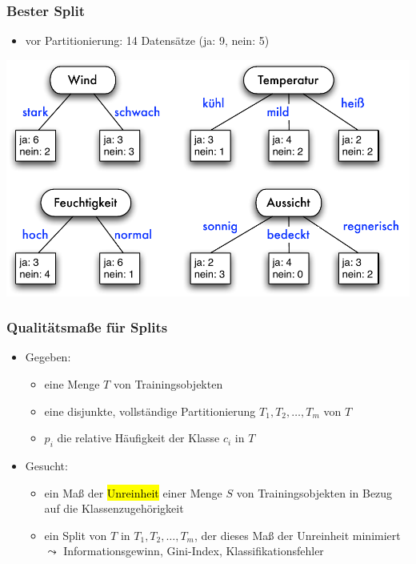 \begin{frame}
\frametitle{Bester Split}

\begin{itemize}
\item vor Partitionierung: 14 Datensätze (ja: 9, nein: 5)
\end{itemize}

\begin{center}
\includegraphics[scale=.5]{fig7/split-bewertung.pdf}
\end{center}

\begin{center}
\end{center}
\end{frame}

\begin{frame}
\frametitle{Qualitätsmaße für Splits}

\begin{itemize}
\item Gegeben:
\begin{itemize}
\item eine Menge $T$ von Trainingsobjekten
\item eine disjunkte, vollständige Partitionierung $T_1, T_2, \dots,
  T_m$  von $T$ 
\item $p_i$ die relative Häufigkeit der Klasse $c_i$ in $T$
\end{itemize}
\item Gesucht:
\begin{itemize}
\item ein Maß der \hl{Unreinheit} einer Menge $S$ von
  Trainingsobjekten in Bezug  auf  die Klassenzugehörigkeit  
\item ein Split von $T$ in $T_1, T_2, \dots, T_m$, der dieses Maß der
  Unreinheit minimiert \\
$\leadsto$ Informationsgewinn, Gini-Index, Klassifikationsfehler
\end{itemize}
\end{itemize}

\end{frame}


